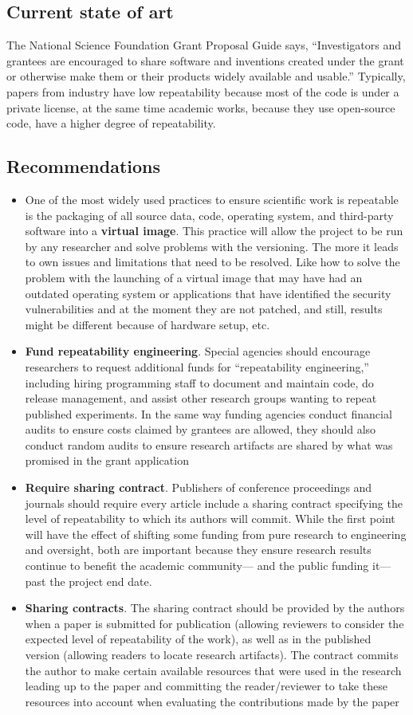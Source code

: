 \subsection{Current state of art}
The National Science Foundation Grant Proposal Guide\cite{nfsgp} says, “Investigators and grantees are encouraged to share software and inventions created under the grant or otherwise make them or their products widely available and usable.” 
Typically, papers from industry have low repeatability because most of the code is under a private license, at the same time academic works, because they use open-source code, have a higher degree of repeatability.
\subsection{Recommendations}
\begin{itemize}
    \item One of the most widely used practices to ensure scientific work is repeatable is the packaging of all source data, code, operating system, and third-party software into a \textbf{virtual image}. This practice will allow the project to be run by any researcher and solve problems with the versioning. The more it leads to own issues and limitations that need to be resolved. Like how to solve the problem with the launching of a virtual image that may have had an outdated operating system or applications that have identified the security vulnerabilities and at the moment they are not patched, and still, results might be different because of hardware setup, etc.
    \item \textbf{Fund repeatability engineering}. Special agencies should encourage researchers to request additional funds for “repeatability engineering,” including hiring programming staff to document and maintain code, do release management, and assist other research groups wanting to repeat published experiments. In the same way funding agencies conduct financial audits to ensure costs claimed by grantees are allowed, they should also conduct random audits to ensure research artifacts are shared by what was promised in the grant application
    \item \textbf{Require sharing contract}. Publishers of conference proceedings and journals should require every article include a sharing contract specifying the level of repeatability to which its authors will commit. While the first point will have the effect of shifting some funding from pure research to engineering and oversight, both are important because they ensure research results continue to benefit the academic community— and the public funding it—past the project end date. 
    \item \textbf{Sharing contracts}. The sharing contract should be provided by the authors when a paper is submitted for publication (allowing reviewers to consider the expected level of repeatability of the work), as well as in the published version (allowing readers to locate research artifacts). The contract commits the author to make certain available resources that were used in the research leading up to the paper and committing the reader/reviewer to take these resources into account when evaluating the contributions made by the paper
\end{itemize}
